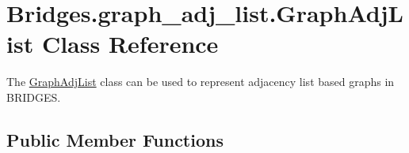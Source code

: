 \hypertarget{class_bridges_1_1graph__adj__list_1_1_graph_adj_list}{}\section{Bridges.\+graph\+\_\+adj\+\_\+list.\+Graph\+Adj\+List Class Reference}
\label{class_bridges_1_1graph__adj__list_1_1_graph_adj_list}


The \hyperlink{class_bridges_1_1graph__adj__list_1_1_graph_adj_list}{Graph\+Adj\+List} class can be used to represent adjacency list based graphs in B\+R\+I\+D\+G\+E\+S.  


\subsection*{Public Member Functions}
